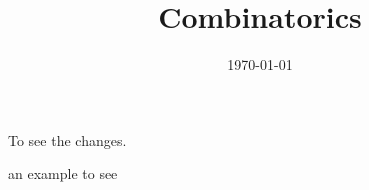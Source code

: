 \documentclass[paper=6.125in:9.25in,twoside,openright,pagesize=pdftex,10pt]{scrbook}
\title{Combinatorics}
\date{\today}
\theoremstyle{definition}
\theoremstyle{remark}
\theoremstyle{definition}
\numberwithin{problem}{chapter}
\numberwithin{remark}{chapter}
\begin{document}
\frontmatter


\mainmatter
{}

To see the changes. 
\begin{example}
an example to see
\end{example}

\backmatter
\renewcommand{\listtheoremname}{List of problems and examples}
\renewcommand\indexname{Index of named problems}

\printindex
\printbibliography

%
\end{document}
